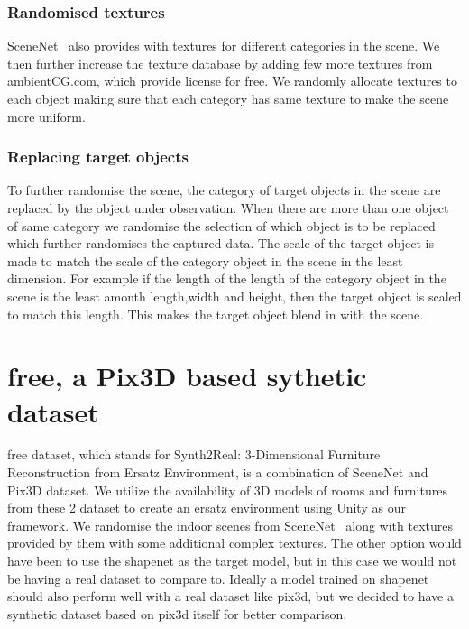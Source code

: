 \subsubsection{Randomised textures}
SceneNet~\cite{McCormac:etal:ICCV2017} also provides with textures for different categories in the scene.
We then further increase the texture database by adding few more textures from ambientCG.com, which provide license for free.
We randomly allocate textures to each object making sure that each category has same texture to make the scene more uniform.

\subsubsection{Replacing target objects}
To further randomise the scene, the category of target objects in the scene are replaced by the object under observation.
When there are more than one object of same category we randomise the selection of which object is to be replaced which further randomises the captured data.
The scale of the target object is made to match the scale of the category object in the scene in the least dimension.
For example if the length of the length of the category object in the scene is the least amonth length,width and height, then the target object is scaled to match this length.
This makes the target object blend in with the scene.

\section{\Gls{free}, a Pix3D based sythetic dataset}\label{sec:s2r:3d-free-a-pix3d-based-sythetic-dataset}

\Gls{free} dataset, which stands for Synth2Real: 3-Dimensional Furniture Reconstruction from Ersatz Environment, is a combination of SceneNet and Pix3D dataset.
We utilize the availability of 3D models of rooms and furnitures from these 2 dataset to create an ersatz environment using Unity as our framework.
We randomise the indoor scenes from SceneNet~\cite{McCormac:etal:ICCV2017} along with textures provided by them with some additional complex textures.
The other option would have been to use the shapenet as the target model, but in this case we would not be having a real dataset to compare to.
Ideally a model trained on shapenet should also perform well with a real dataset like pix3d, but we decided to have a synthetic dataset based on pix3d itself for better comparison.

